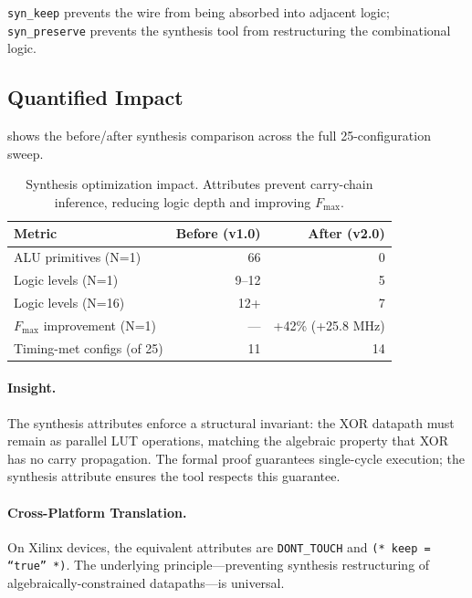 \documentclass[11pt,letterpaper]{article}
\theoremstyle{plain}
\theoremstyle{definition}
\theoremstyle{remark}
\newcommand{\fmax}{$F_{\max}$}
\begin{document}
\texttt{syn\_keep} prevents the wire from being absorbed into adjacent logic; \texttt{syn\_preserve} prevents the synthesis tool from restructuring the combinational logic.

\subsection{Quantified Impact}

 shows the before/after synthesis comparison across the full 25-configuration sweep.

\begin{table}[!htbp]
\centering
\caption{Synthesis optimization impact. Attributes prevent carry-chain inference, reducing logic depth and improving \fmax{}.}
\label{tab:optimization}
\begin{tabular}{@{}lrr@{}}
\toprule
\textbf{Metric} & \textbf{Before (v1.0)} & \textbf{After (v2.0)} \\
\midrule
ALU primitives (N=1) & 66 & 0 \\
Logic levels (N=1) & 9--12 & 5 \\
Logic levels (N=16) & 12+ & 7 \\
\fmax{} improvement (N=1) & --- & +42\% (+25.8 MHz) \\
Timing-met configs (of 25) & 11 & 14 \\
\bottomrule
\end{tabular}
\end{table}

\paragraph{Insight.} The synthesis attributes enforce a structural invariant: the XOR datapath must remain as parallel LUT operations, matching the algebraic property that XOR has no carry propagation. The formal proof guarantees single-cycle execution; the synthesis attribute ensures the tool respects this guarantee.

\paragraph{Cross-Platform Translation.} On Xilinx devices, the equivalent attributes are \texttt{DONT\_TOUCH} and \texttt{(\allowbreak{}* keep = ``true'' *)}. The underlying principle---preventing synthesis restructuring of algebraically-constrained datapaths---is universal.

\end{document}
